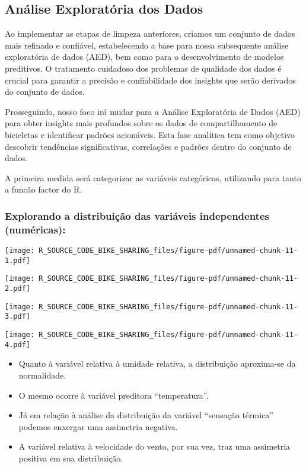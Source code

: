 \documentclass[
  letterpaper,
  DIV=11,
  numbers=noendperiod]{scrartcl}
\begin{document}
\subsection{Análise Exploratória dos
Dados}\label{anuxe1lise-exploratuxf3ria-dos-dados}

Ao implementar as etapas de limpeza anteriores, criamos um conjunto de
dados mais refinado e confiável, estabelecendo a base para nossa
subsequente análise exploratória de dados (AED), bem como para o
desenvolvimento de modelos preditivos. O tratamento cuidadoso dos
problemas de qualidade dos dados é crucial para garantir a precisão e
confiabilidade dos insights que serão derivados do conjunto de dados.

Prosseguindo, nosso foco irá mudar para a Análise Exploratória de Dados
(AED) para obter insights mais profundos sobre os dados de
compartilhamento de bicicletas e identificar padrões acionáveis. Esta
fase analítica tem como objetivo descobrir tendências significativas,
correlações e padrões dentro do conjunto de dados.

A primeira medida será categorizar as variáveis categóricas, utilizando
para tanto a funcão factor do R.

\subsubsection{Explorando a distribuição das variáveis independentes
(numéricas):}\label{explorando-a-distribuiuxe7uxe3o-das-variuxe1veis-independentes-numuxe9ricas}

\begin{center}
\texttt{[image: R\_SOURCE\_CODE\_BIKE\_SHARING\_files/figure-pdf/unnamed-chunk-11-1.pdf]}
\end{center}

\begin{center}
\texttt{[image: R\_SOURCE\_CODE\_BIKE\_SHARING\_files/figure-pdf/unnamed-chunk-11-2.pdf]}
\end{center}

\begin{center}
\texttt{[image: R\_SOURCE\_CODE\_BIKE\_SHARING\_files/figure-pdf/unnamed-chunk-11-3.pdf]}
\end{center}

\begin{center}
\texttt{[image: R\_SOURCE\_CODE\_BIKE\_SHARING\_files/figure-pdf/unnamed-chunk-11-4.pdf]}
\end{center}

\begin{itemize}
\item
  Quanto à variável relativa à umidade relativa, a distribuição
  aproxima-se da normalidade.
\item
  O mesmo ocorre à variável preditora ``temperatura''.
\item
  Já em relação à análise da distribuição da variável ``sensação
  térmica'' podemos enxergar uma assimetria negativa.
\item
  A variável relativa à velocidade do vento, por sua vez, traz uma
  assimetria positiva em sua distribuição.
\end{itemize}
\end{document}

